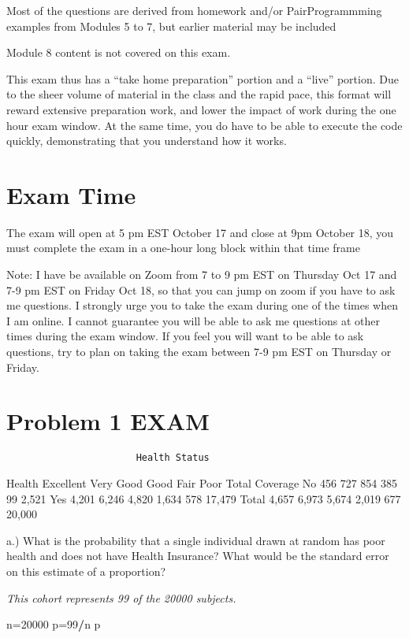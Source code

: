 \documentclass[
]{article}
\newenvironment{Shaded}{\begin{snugshade}}{\end{snugshade}}
\newcommand{\DecValTok}[1]{\textcolor[rgb]{0.00,0.00,0.81}{#1}}
\newcommand{\NormalTok}[1]{#1}
\newcommand{\OtherTok}[1]{\textcolor[rgb]{0.56,0.35,0.01}{#1}}
\newcommand{\SpecialCharTok}[1]{\textcolor[rgb]{0.81,0.36,0.00}{\textbf{#1}}}
\begin{document}
Most of the questions are derived from homework and/or PairProgrammming
examples from Modules 5 to 7, but earlier material may be included

Module 8 content is not covered on this exam.

This exam thus has a ``take home preparation'' portion and a ``live''
portion. Due to the sheer volume of material in the class and the rapid
pace, this format will reward extensive preparation work, and lower the
impact of work during the one hour exam window. At the same time, you do
have to be able to execute the code quickly, demonstrating that you
understand how it works.

\section{Exam Time}\label{exam-time}

The exam will open at 5 pm EST October 17 and close at 9pm October 18,
you must complete the exam in a one-hour long block within that time
frame

Note: I have be available on Zoom from 7 to 9 pm EST on Thursday Oct 17
and 7-9 pm EST on Friday Oct 18, so that you can jump on zoom if you
have to ask me questions. I strongly urge you to take the exam during
one of the times when I am online. I cannot guarantee you will be able
to ask me questions at other times during the exam window. If you feel
you will want to be able to ask questions, try to plan on taking the
exam between 7-9 pm EST on Thursday or Friday.

\section{Problem 1 EXAM}\label{problem-1-exam}

\begin{verbatim}
                       Health Status
\end{verbatim}

Health Excellent Very Good Good Fair Poor Total Coverage No 456 727 854
385 99 2,521 Yes 4,201 6,246 4,820 1,634 578 17,479 Total 4,657 6,973
5,674 2,019 677 20,000

a.) What is the probability that a single individual drawn at random has
poor health and does not have Health Insurance? What would be the
standard error on this estimate of a proportion?

\emph{This cohort represents 99 of the 20000 subjects.}

\begin{Shaded}
\begin{Highlighting}[]
\NormalTok{n}\OtherTok{=}\DecValTok{20000}
\NormalTok{p}\OtherTok{=}\DecValTok{99}\SpecialCharTok{/}\NormalTok{n}
\NormalTok{p}
\end{Highlighting}
\end{Shaded}
\end{document}
